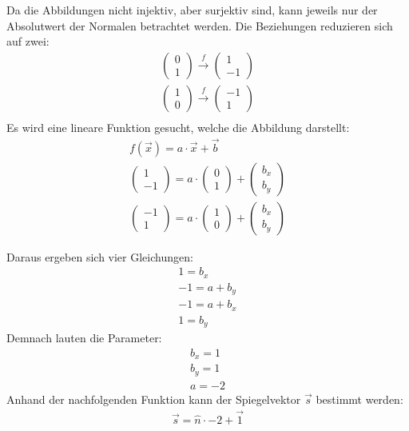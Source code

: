 Da die Abbildungen nicht injektiv, aber surjektiv sind, kann jeweils nur der Absolutwert der Normalen betrachtet
werden. Die Beziehungen reduzieren sich auf zwei:
\begin{align}
    \begin{pmatrix}0 \\ 1\end{pmatrix} \xrightarrow{f} \begin{pmatrix}1 \\ -1\end{pmatrix}\\
    \begin{pmatrix}1 \\ 0\end{pmatrix} \xrightarrow{f} \begin{pmatrix}-1 \\ 1\end{pmatrix}\\
\end{align}
Es wird eine lineare Funktion gesucht, welche die Abbildung darstellt:
\begin{align}
    f(\vec{x}) = a \cdot \vec{x} + \vec{b}\\
    \begin{pmatrix}1 \\ -1\end{pmatrix} = a \cdot \begin{pmatrix}0 \\ 1\end{pmatrix} + \begin{pmatrix}b_x \\ b_y\end{pmatrix}\\
    \begin{pmatrix}-1 \\ 1\end{pmatrix} = a \cdot \begin{pmatrix}1 \\ 0\end{pmatrix} + \begin{pmatrix}b_x \\ b_y\end{pmatrix}
\end{align}

Daraus ergeben sich vier Gleichungen:
\begin{align}
    1 = b_x\\
    -1 = a + b_y\\
    -1 = a + b_x\\
    1 = b_y
\end{align}
Demnach lauten die Parameter:
\begin{align}
    b_x = 1\\
    b_y = 1\\
    a = -2
\end{align}
Anhand der nachfolgenden Funktion kann der Spiegelvektor $\vec{s}$ bestimmt werden:
\begin{align}
    \vec{s} = \hat{n} \cdot -2 + \vec{1}
\end{align}


